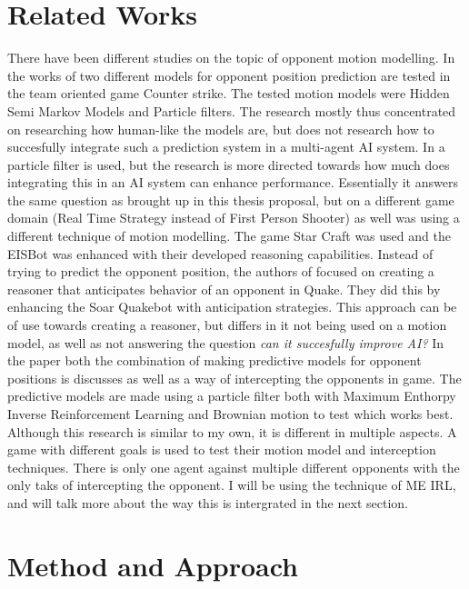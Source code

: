 \documentclass[a4paper, 12pt]{article}
\begin{document}
\section{Related Works}
There have been different studies on the topic of opponent motion modelling.
In the works of \citep{Hladky_anevaluation} two different models for opponent
position prediction are tested in the team oriented game Counter strike. 
The tested motion models were
Hidden Semi Markov Models and Particle filters.
The research mostly thus concentrated on researching how human-like the
models are, but does not research how to succesfully integrate such a prediction system in a multi-agent AI system.
In \citep{weber2011aiide} a particle filter is used, but
the research is more directed towards how much does
integrating this in an AI system can enhance performance. Essentially it answers
the same question as brought up in this thesis proposal, but on a different game
domain (Real Time Strategy instead of First Person Shooter) as well was using a
different technique of motion modelling. The game Star Craft was used and the EISBot was enhanced with their developed reasoning capabilities.
Instead of trying to predict the opponent position, the authors of
\citep{Laird:2001:KYG:375735.376343} focused on creating a reasoner that
anticipates behavior of an opponent in Quake. They did this by enhancing the
Soar Quakebot with anticipation strategies. This approach can be of use towards
creating a reasoner, but differs in it not being used on a motion model, as well
as not answering the question \emph{can it succesfully improve AI?}
In the paper \citep{6374144} both the combination of making predictive models
for opponent positions is discusses as well as a way of intercepting the
opponents in game. The predictive models are made using a particle filter both
with Maximum Enthorpy Inverse Reinforcement Learning and Brownian motion to test
which works best. Although this research is similar to my own, it
is different in multiple aspects. A game with different goals is used to test
their motion model and interception techniques. There is only one agent against
multiple different opponents with the only taks of intercepting the opponent. I
will be using the technique of ME IRL, and will talk more about the way this is
intergrated in the next section.

\section{Method and Approach}
\end{document}
